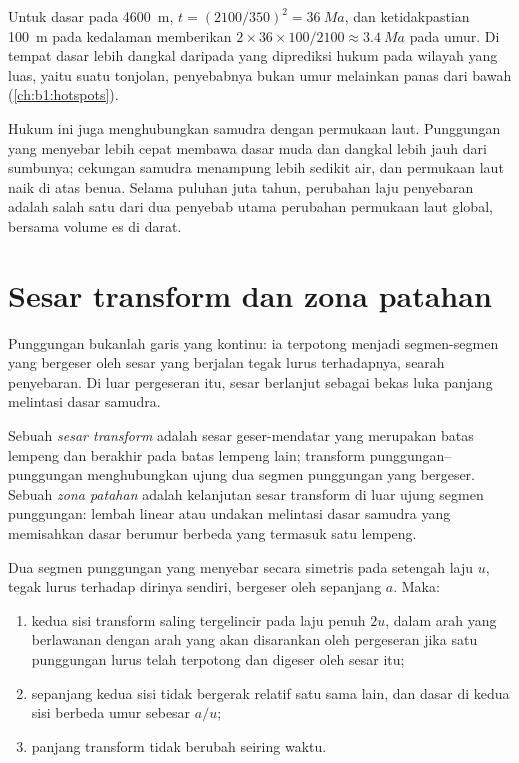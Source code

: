 Untuk dasar pada \qty{4600}{m}, $t = (2100/350)^2 = \qty{36}{Ma}$, dan ketidakpastian \qty{100}{m} pada kedalaman memberikan $2\times36\times100/2100 \approx
\qty{3.4}{Ma}$ pada umur. Di tempat dasar lebih dangkal daripada yang diprediksi hukum pada wilayah yang luas, yaitu suatu tonjolan, penyebabnya bukan umur melainkan panas dari bawah (\cref{ch:b1:hotspots}).

Hukum ini juga menghubungkan samudra dengan permukaan laut. Punggungan yang menyebar lebih cepat membawa dasar muda dan dangkal lebih jauh dari sumbunya; cekungan samudra menampung lebih sedikit air, dan permukaan laut naik di atas benua. Selama puluhan juta tahun, perubahan laju penyebaran adalah salah satu dari dua penyebab utama perubahan permukaan laut global, bersama volume es di darat.

\section{Sesar transform dan zona patahan}

Punggungan bukanlah garis yang kontinu: ia terpotong menjadi segmen-segmen yang bergeser oleh sesar yang berjalan tegak lurus terhadapnya, searah penyebaran. Di luar pergeseran itu, sesar berlanjut sebagai bekas luka panjang melintasi dasar samudra.

\begin{definition}\label{def:b1:rifts-ridges-margins:transform}
Sebuah \emph{sesar transform} adalah sesar geser-mendatar yang merupakan batas lempeng dan berakhir pada batas lempeng lain; transform punggungan--punggungan menghubungkan ujung dua segmen punggungan yang bergeser. Sebuah \emph{zona patahan} adalah kelanjutan sesar transform di luar ujung segmen punggungan: lembah linear atau undakan melintasi dasar samudra yang memisahkan dasar berumur berbeda yang termasuk satu lempeng.
\end{definition}

\begin{proposition}\label{prop:b1:rifts-ridges-margins:transform}
Dua segmen punggungan yang menyebar secara simetris pada setengah laju $u$, tegak lurus terhadap dirinya sendiri, bergeser oleh  sepanjang $a$. Maka:
\begin{enumerate}
  \item kedua sisi transform saling tergelincir pada laju penuh $2u$, dalam arah yang berlawanan dengan arah yang akan disarankan oleh pergeseran jika satu punggungan lurus telah terpotong dan digeser oleh sesar itu;
  \item sepanjang  kedua sisi tidak bergerak relatif satu sama lain, dan
        dasar di kedua sisi berbeda umur sebesar $a/u$;
  \item panjang transform tidak berubah seiring waktu.
\end{enumerate}
\end{proposition}

